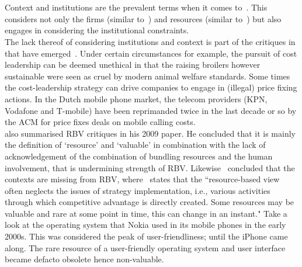\section{}

Context and institutions are the prevalent terms when it comes to~\ibv. %
This \ibv considers not only the firms (similar to~\cite{Porter:1980}) and resources (similar to~\cite{Barney:1991}) but also engages in considering the institutional constraints.\\
The lack thereof of considering institutions and context is part of the critiques in that have emerged~\cite{Narayanan:2005}.
Under certain circumstances for example, the pursuit of cost leadership can be deemed unethical in that the raising broilers however sustainable were seen as cruel by modern animal welfare standards. 
Some times the cost-leadership strategy can drive companies to engage in (illegal) price fixing actions. 
In the Dutch mobile phone market, the telecom providers (KPN, Vodafone and T-mobile) have been reprimanded twice in the last decade or so by the \gls{ACM} for price fixes deals on mobile calling costs. \\
\cite{Kraaijenbrink:2009} also summarised \gls{RBV} critiques in his 2009 paper. 
He concluded that it is mainly the definition of `resource' and `valuable' in combination with the lack of acknowledgement of the combination of bundling resources and the human involvement, that is undermining strength of \gls{RBV}.
Likewise~\cite{Priem:2001} concluded that the contexts are missing from \gls{RBV}, where~\cite{Dung:2012} states that the ``resource-based view often neglects the issues of strategy implementation, i.e., various activities through which competitive advantage is directly created. Some resources may be valuable and rare at some point in time, this can change in an instant." 
Take a look at the operating system that Nokia used in its mobile phones in the early 2000s. 
This was considered the peak of user-friendliness; until the iPhone came along. 
The rare resource of a user-friendly operating system and user interface became defacto obsolete hence non-valuable.\\

